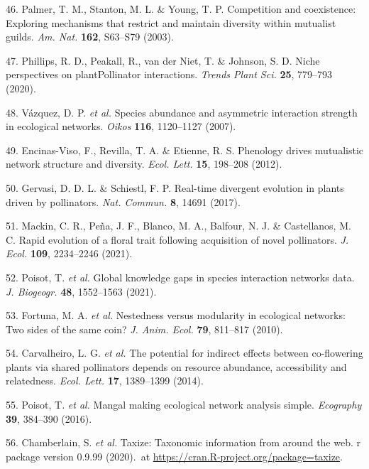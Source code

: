 \documentclass[12pt,a4paper,]{article}
\begin{document}
\hypertarget{ref-palmer2003}{}
46. Palmer, T. M., Stanton, M. L. \& Young, T. P. Competition and
coexistence: Exploring mechanisms that restrict and maintain diversity
within mutualist guilds. \emph{Am. Nat.} \textbf{162}, S63--S79 (2003).

\hypertarget{ref-phillips2020}{}
47. Phillips, R. D., Peakall, R., van der Niet, T. \& Johnson, S. D.
Niche perspectives on plantPollinator interactions. \emph{Trends Plant
Sci.} \textbf{25}, 779--793 (2020).

\hypertarget{ref-vazquez2007}{}
48. Vázquez, D. P. \emph{et al.} Species abundance and asymmetric
interaction strength in ecological networks. \emph{Oikos} \textbf{116},
1120--1127 (2007).

\hypertarget{ref-encinas2012}{}
49. Encinas-Viso, F., Revilla, T. A. \& Etienne, R. S. Phenology drives
mutualistic network structure and diversity. \emph{Ecol. Lett.}
\textbf{15}, 198--208 (2012).

\hypertarget{ref-gervasi2017}{}
50. Gervasi, D. D. L. \& Schiestl, F. P. Real-time divergent evolution
in plants driven by pollinators. \emph{Nat. Commun.} \textbf{8}, 14691
(2017).

\hypertarget{ref-mackin2021}{}
51. Mackin, C. R., Peña, J. F., Blanco, M. A., Balfour, N. J. \&
Castellanos, M. C. Rapid evolution of a floral trait following
acquisition of novel pollinators. \emph{J. Ecol.} \textbf{109},
2234--2246 (2021).

\hypertarget{ref-poisot2021}{}
52. Poisot, T. \emph{et al.} Global knowledge gaps in species
interaction networks data. \emph{J. Biogeogr.} \textbf{48}, 1552--1563
(2021).

\hypertarget{ref-fortuna2010}{}
53. Fortuna, M. A. \emph{et al.} Nestedness versus modularity in
ecological networks: Two sides of the same coin? \emph{J. Anim. Ecol.}
\textbf{79}, 811--817 (2010).

\hypertarget{ref-carvalheiro2014}{}
54. Carvalheiro, L. G. \emph{et al.} The potential for indirect effects
between co-flowering plants via shared pollinators depends on resource
abundance, accessibility and relatedness. \emph{Ecol. Lett.}
\textbf{17}, 1389--1399 (2014).

\hypertarget{ref-poisot2016}{}
55. Poisot, T. \emph{et al.} Mangal making ecological network analysis
simple. \emph{Ecography} \textbf{39}, 384--390 (2016).

\hypertarget{ref-chamberlain2020}{}
56. Chamberlain, S. \emph{et al.} Taxize: Taxonomic information from
around the web. r package version 0.9.99 (2020).~at
\href{https://CRAN.R-project.org/package=taxize}{https://cran.R-project.org/package=taxize}.
\end{document}
